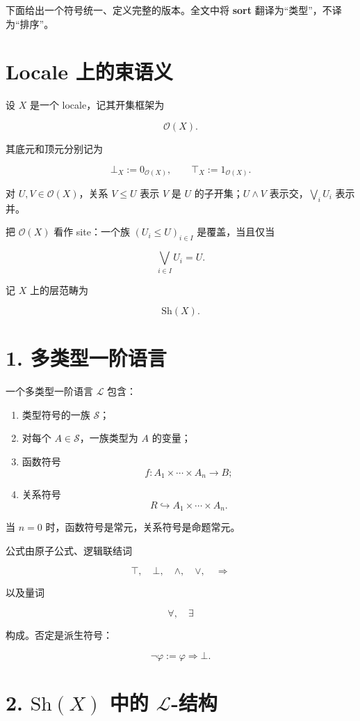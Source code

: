 \documentclass{ctexart}
\begin{document}
下面给出一个符号统一、定义完整的版本。全文中将 \textbf{sort} 翻译为``类型''，不译为``排序''。

\section*{Locale 上的束语义}

设 $X$ 是一个 locale，记其开集框架为

\[
\mathcal O(X).
\]

其底元和顶元分别记为

\[
\bot_X:=0_{\mathcal O(X)},
\qquad
\top_X:=1_{\mathcal O(X)}.
\]

对 $U,V\in\mathcal O(X)$，关系 $V\le U$ 表示 $V$ 是 $U$ 的子开集；$U\wedge V$ 表示交，$\bigvee_iU_i$ 表示并。

把 $\mathcal O(X)$ 看作 site：一个族 $(U_i\le U)_{i\in I}$ 是覆盖，当且仅当

\[
\bigvee_{i\in I}U_i=U.
\]

记 $X$ 上的层范畴为

\[
\mathrm{Sh}(X).
\]

\section*{1. 多类型一阶语言}

一个多类型一阶语言 $\mathcal L$ 包含：

\begin{enumerate}[leftmargin=2em]
    \item 类型符号的一族 $\mathcal S$；
    \item 对每个 $A\in\mathcal S$，一族类型为 $A$ 的变量；
    \item 函数符号
    \[
    f:A_1\times\cdots\times A_n\to B;
    \]
    \item 关系符号
    \[
    R\hookrightarrow A_1\times\cdots\times A_n.
    \]
\end{enumerate}

当 $n=0$ 时，函数符号是常元，关系符号是命题常元。

公式由原子公式、逻辑联结词

\[
\top,\quad\bot,\quad\wedge,\quad\vee,\quad\Rightarrow
\]

以及量词

\[
\forall,\quad\exists
\]

构成。否定是派生符号：

\[
\neg\varphi:=\varphi\Rightarrow\bot.
\]

\section*{2. $\mathrm{Sh}(X)$ 中的 $\mathcal L$-结构}
\end{document}
